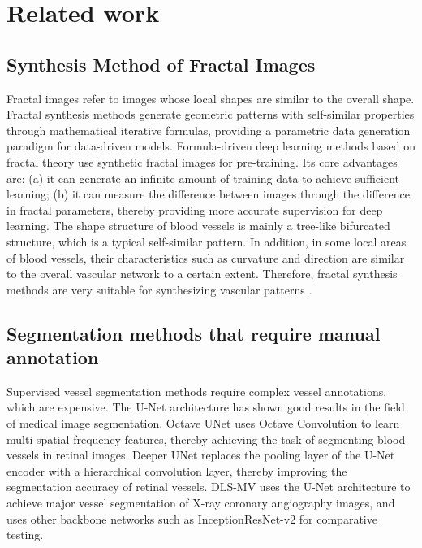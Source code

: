 \section{Related work}
\label{sec:formatting}

\subsection{Synthesis Method of Fractal Images}

Fractal images refer to images whose local shapes are similar to the overall shape. Fractal synthesis methods generate geometric patterns with self-similar properties through mathematical iterative formulas, providing a parametric data generation paradigm for data-driven models. Formula-driven deep learning methods based on fractal theory \cite{01.04.DataBase}\cite{01.05.without Natural Images} use synthetic fractal images for pre-training. Its core advantages are: (a) it can generate an infinite amount of training data to achieve sufficient learning; (b) it can measure the difference between images through the difference in fractal parameters, thereby providing more accurate supervision for deep learning. The shape structure of blood vessels is mainly a tree-like bifurcated structure, which is a typical self-similar pattern. In addition, in some local areas of blood vessels, their characteristics such as curvature and direction are similar to the overall vascular network to a certain extent. Therefore, fractal synthesis methods are very suitable for synthesizing vascular patterns \cite{01.02.SSVS}.

\subsection{Segmentation methods that require manual annotation}

Supervised vessel segmentation methods require complex vessel annotations, which are expensive. The U-Net\cite{FC.32.U-Net} architecture has shown good results in the field of medical image segmentation. Octave UNet\cite{SSVS.8} uses Octave Convolution to learn multi-spatial frequency features, thereby achieving the task of segmenting blood vessels in retinal images. Deeper UNet\cite{SSVS.33} replaces the pooling layer of the U-Net encoder with a hierarchical convolution layer, thereby improving the segmentation accuracy of retinal vessels. DLS-MV\cite{SSVS.36} uses the U-Net architecture to achieve major vessel segmentation of X-ray coronary angiography images, and uses other backbone networks such as InceptionResNet-v2 for comparative testing.

